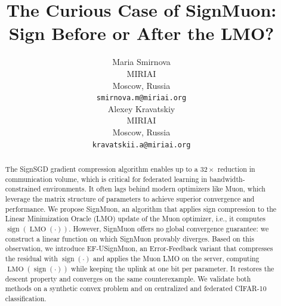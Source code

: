 \documentclass{article}
\title{The Curious Case of SignMuon: Sign Before or After the LMO?}
\author{
Maria Smirnova\\
  MIRIAI\\
  Moscow, Russia\\
  \texttt{smirnova.m@miriai.org}\\
  \And
  Alexey Kravatskiy \\
  MIRIAI\\
  Moscow, Russia\\
  \texttt{kravatskii.a@miriai.org}\\
}
\begin{document}
\maketitle

\begin{abstract}\label{sec:abs}
The SignSGD gradient compression algorithm enables up to a $32\times$ reduction in communication volume, which is critical for federated learning in bandwidth-constrained environments. It often lags behind modern optimizers like Muon, which leverage the matrix structure of parameters to achieve superior convergence and performance. We propose SignMuon, an algorithm that applies sign compression to the Linear Minimization Oracle (LMO) update of the Muon optimizer, i.e., it computes $\operatorname{sign}(\operatorname{LMO}(\cdot))$. However, SignMuon offers no global convergence guarantee: we construct a linear function on which SignMuon provably diverges. Based on this observation, we introduce EF-USignMuon, an Error-Feedback variant that compresses the residual with $\operatorname{sign}(\cdot)$ and applies the Muon LMO on the server, computing $\operatorname{LMO}(\operatorname{sign}(\cdot))$ while keeping the uplink at one bit per parameter. It restores the descent property and converges on the same counterexample. We validate both methods on a synthetic convex problem and on centralized and federated CIFAR-10 classification.
\end{abstract}


\end{document}
